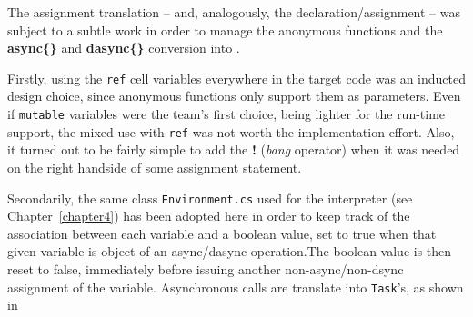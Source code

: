 The assignment translation -- and, analogously, the declaration/assignment -- was subject to a subtle work in order to manage the anonymous functions and the \textbf{async\{\}} and \textbf{dasync\{\}} conversion into \fsharp. 

Firstly, using the \texttt{ref} cell variables everywhere in the target code was an inducted design choice, since \fsharp anonymous functions only support them as parameters. Even if \texttt{mutable} variables were the team's first choice, being lighter for the run-time support, the mixed use with \texttt{ref} was not worth the implementation effort. Also, it turned out to be fairly simple to add the \textbf{!} (\textit{bang} operator) when it was needed on the right handside of some assignment statement.

Secondarily, the same class \texttt{Environment.cs} used for the interpreter (see Chapter~\ref{chapter4}) has been adopted here in order to keep track of the association between each variable and a boolean value, set to true when that given variable is object of an async/dasync operation.The boolean value is then reset to false, immediately before issuing another non-async/non-dsync assignment of the variable. Asynchronous calls are translate into \fsharp \texttt{Task}'s, as shown in %




